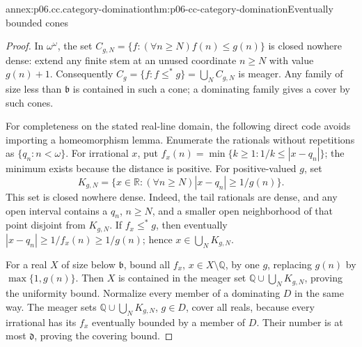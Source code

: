 \begin{annexitem}{annex:p06.cc.category-domination}{thm:p06-cc-category-domination}{Eventually bounded cones}
\begin{proof}
In \(\omega^\omega\), the set
\(C_{g,N}=\{f:(\forall n\geq N)f(n)\leq g(n)\}\) is closed nowhere
dense: extend any finite stem at an unused coordinate \(n\geq N\)
with value \(g(n)+1\). Consequently
\(C_g=\{f:f\leq^*g\}=\bigcup_N C_{g,N}\) is meager. Any family
of size less than \(\mathfrak b\) is contained in such a cone; a
dominating family gives a cover by such cones.

For completeness on the stated real-line domain, the following direct
code avoids importing a homeomorphism lemma. Enumerate the rationals
without repetitions as \(\{q_n:n<\omega\}\). For irrational \(x\),
put \(f_x(n)=\min\{k\geq1:1/k\leq|x-q_n|\}\); the minimum exists
because the distance is positive. For positive-valued \(g\), set
\[
 K_{g,N}=\{x\in\mathbb R:(\forall n\geq N)|x-q_n|\geq1/g(n)\}.
\]
This set is closed nowhere dense. Indeed, the tail rationals are dense,
and any open interval contains a \(q_n\), \(n\geq N\), and a smaller
open neighborhood of that point disjoint from \(K_{g,N}\).
If \(f_x\leq^*g\), then eventually
\(|x-q_n|\geq1/f_x(n)\geq1/g(n)\); hence
\(x\in\bigcup_NK_{g,N}\).

For a real \(X\) of size below \(\mathfrak b\), bound all
\(f_x\), \(x\in X\setminus\mathbb Q\), by one \(g\), replacing
\(g(n)\) by \(\max\{1,g(n)\}\). Then \(X\) is contained in
the meager set \(\mathbb Q\cup\bigcup_NK_{g,N}\), proving the
uniformity bound. Normalize every member of a dominating \(D\) in
the same way. The meager sets
\(\mathbb Q\cup\bigcup_NK_{g,N}\), \(g\in D\), cover all reals,
because every irrational has its \(f_x\) eventually bounded by a
member of \(D\). Their number is at most \(\mathfrak d\), proving
the covering bound.
\end{proof}
\end{annexitem}

